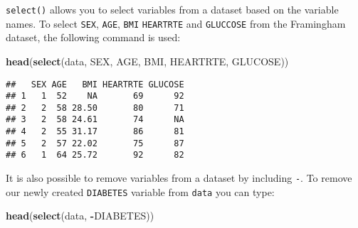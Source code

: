 \documentclass[
]{article}
\newenvironment{Shaded}{\begin{snugshade}}{\end{snugshade}}
\newcommand{\KeywordTok}[1]{\textcolor[rgb]{0.13,0.29,0.53}{\textbf{#1}}}
\newcommand{\NormalTok}[1]{#1}
\newcommand{\OperatorTok}[1]{\textcolor[rgb]{0.81,0.36,0.00}{\textbf{#1}}}
\begin{document}
\texttt{select()} allows you to select variables from a dataset based on
the variable names. To select \texttt{SEX}, \texttt{AGE}, \texttt{BMI}
\texttt{HEARTRTE} and \texttt{GLUCCOSE} from the Framingham dataset, the
following command is used:

\begin{Shaded}
\begin{Highlighting}[]
\KeywordTok{head}\NormalTok{(}\KeywordTok{select}\NormalTok{(data, SEX, AGE, BMI, HEARTRTE, GLUCOSE))}
\end{Highlighting}
\end{Shaded}

\begin{verbatim}
##   SEX AGE   BMI HEARTRTE GLUCOSE
## 1   1  52    NA       69      92
## 2   2  58 28.50       80      71
## 3   2  58 24.61       74      NA
## 4   2  55 31.17       86      81
## 5   2  57 22.02       75      87
## 6   1  64 25.72       92      82
\end{verbatim}

It is also possible to remove variables from a dataset by including
\texttt{-}. To remove our newly created \texttt{DIABETES} variable from
\texttt{data} you can type:

\begin{Shaded}
\begin{Highlighting}[]
\KeywordTok{head}\NormalTok{(}\KeywordTok{select}\NormalTok{(data, }\OperatorTok{-}\NormalTok{DIABETES))}
\end{Highlighting}
\end{Shaded}
\end{document}
